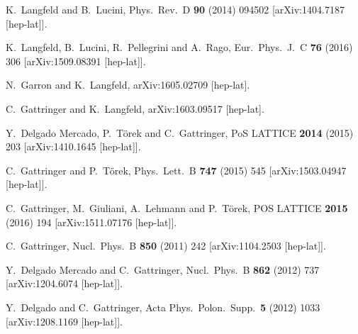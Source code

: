 \documentclass[a4paper,11pt]{article}
\begin{document}
\begin{thebibliography}{12}
  K.~Langfeld and B.~Lucini,
  Phys.\ Rev.\ D {\bf 90} (2014) 094502
  [arXiv:1404.7187 [hep-lat]].

  K.~Langfeld, B.~Lucini, R.~Pellegrini and A.~Rago,
  Eur.\ Phys.\ J.\ C {\bf 76} (2016) 306
  [arXiv:1509.08391 [hep-lat]].

  N.~Garron and K.~Langfeld,
  arXiv:1605.02709 [hep-lat].

  C.~Gattringer and K.~Langfeld,
  arXiv:1603.09517 [hep-lat].

  Y.~Delgado Mercado, P.~T\"orek and C.~Gattringer,
  PoS LATTICE {\bf 2014} (2015) 203
  [arXiv:1410.1645 [hep-lat]].
 
  C.~Gattringer and P.~T\"orek,
  Phys.\ Lett.\ B {\bf 747} (2015) 545
  [arXiv:1503.04947 [hep-lat]].

  C.~Gattringer, M.~Giuliani, A.~Lehmann and P.~T\"orek,
  POS LATTICE {\bf 2015} (2016) 194
  [arXiv:1511.07176 [hep-lat]].
 
  C.~Gattringer,
  Nucl.\ Phys.\ B {\bf 850} (2011) 242
  [arXiv:1104.2503 [hep-lat]].

  Y.~Delgado Mercado and C.~Gattringer,
  Nucl.\ Phys.\ B {\bf 862} (2012) 737
  [arXiv:1204.6074 [hep-lat]].

  Y.~Delgado and C.~Gattringer,
  Acta Phys.\ Polon.\ Supp.\  {\bf 5} (2012) 1033
  [arXiv:1208.1169 [hep-lat]].

 
\end{thebibliography}
\end{document}
